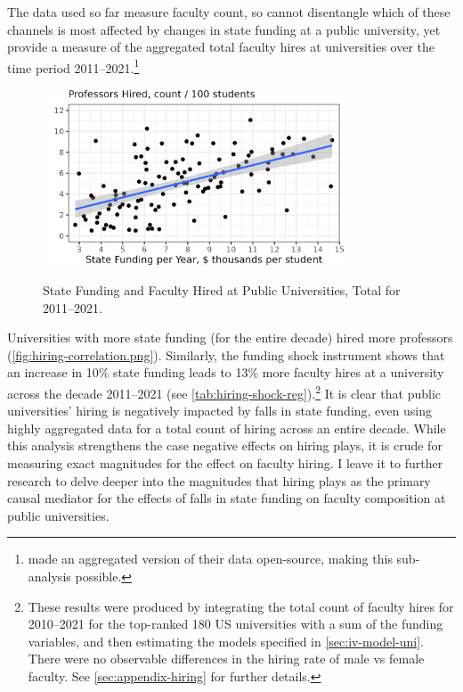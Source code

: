 The data used so far measure faculty count, so cannot disentangle which of these channels is most affected by changes in state funding at a public university, yet \cite{wapman2022quantifying} provide a measure of the aggregated total faculty hires at universities over the time period 2011--2021.\footnote{
    \citep{wapman2022quantifying} made an aggregated version of their data open-source, making this sub-analysis possible.
}
\begin{figure}[h!]
    \centering
    \singlespacing
    \caption{State Funding and Faculty Hired at Public Universities, Total for 2011--2021.}
    \includegraphics[width=0.8\textwidth]{figures/hiring-correlation.png}
    \label{fig:hiring-correlation.png}
\end{figure}

Universities with more state funding (for the entire decade) hired more professors (\autoref{fig:hiring-correlation.png}).
Similarly, the funding shock instrument shows that an increase in 10\% state funding leads to 13\% more faculty hires at a university across the decade 2011--2021 (see \autoref{tab:hiring-shock-reg}).\footnote{
    These results were produced by integrating the total count of faculty hires for 2010--2021 for the top-ranked 180 US universities with a sum of the funding variables, and then estimating the models specified in \autoref{sec:iv-model-uni}.
    There were no observable differences in the hiring rate of male vs female faculty.
    See \autoref{sec:appendix-hiring} for further details.
}
It is clear that public universities' hiring is negatively impacted by falls in state funding, even using highly aggregated data for a total count of hiring across an entire decade.
While this analysis strengthens the case negative effects on hiring plays, it is crude for measuring exact magnitudes for the effect on faculty hiring.
I leave it to further research to delve deeper into the magnitudes that hiring plays as the primary causal mediator for the effects of falls in state funding on faculty composition at public universities.
